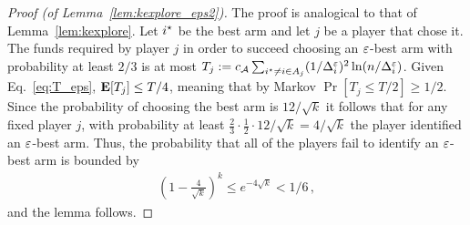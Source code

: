 \documentclass{article} %
\newcommand{\cA}{c_\mathcal{A}}
\begin{document}
\begin{proof}[Proof (of Lemma~\ref{lem:kexplore_eps2})]
The proof is analogical to that of Lemma~\ref{lem:kexplore}.
Let $i^\star$ be the best arm and let $j$ be a player that chose it. The funds required by player $j$ in order to succeed choosing an $\varepsilon$-best arm with probability at least $2/3$ is at most
$
	T_j	:= \cA \sum_{i^\st \ne i \in A_j}
		(1/\Del_i^{\eps})^2 \ln (n/\Del_i^{\eps})
$.
Given Eq.~\eqref{eq:T_eps}, $\mathbf{E}[T_j] \leq T/4$, meaning that by Markov $\Pr[T_j \le T/2] \geq 1/2$. Since the probability of choosing the best arm is $12/\sqrt{k}$ it follows that for any fixed player $j$, with probability at least $\tfrac{2}{3} \cdot \tfrac{1}{2} \cdot 12/\sqrt{k} = 4/\sqrt{k}$ the player identified an $\varepsilon$-best arm.
Thus, the probability that all of the players fail to identify an $\varepsilon$-best arm is bounded by
\begin{align*}
	\left( 1- \tfrac{4}{\sqrt{k}} \right)^k
	\le e^{-4\sqrt{k}}
	< 1/6 \,,
\end{align*}
and the lemma follows.
\end{proof}
\end{document}
